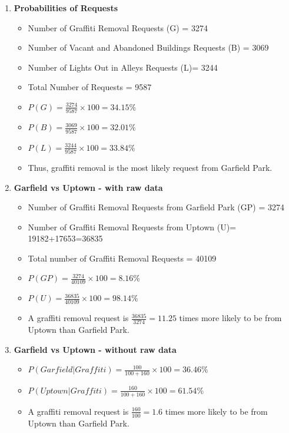 \documentclass[letterpaper,12pt]{article}
\begin{document}
\begin{enumerate}[label = \Alph*]
\item \textbf{Probabilities of Requests}
\begin{itemize}
\item Number of Graffiti Removal Requests (G) = 3274
\item Number of Vacant and Abandoned Buildings Requests (B) = 3069
\item Number of Lights Out in Alleys Requests (L)= 3244
\item Total Number of Requests = 9587
\item $P(G) = \frac{3274}{9587} \times 100 = 34.15\%$
\item $P(B) = \frac{3069}{9587} \times 100 = 32.01\%$
\item $P(L) = \frac{3244}{9587} \times 100 = 33.84\%$
\item Thus, graffiti removal is the most likely request from Garfield Park.
\end{itemize}

\item \textbf{Garfield vs Uptown - with raw data}
\begin{itemize}
\item Number of Graffiti Removal Requests from Garfield Park (GP) = 3274
\item Number of Graffiti Removal Requests from Uptown (U)= 19182+17653=36835
\item Total number of Graffiti Removal Requests = 40109
\item $P(GP) = \frac{3274}{40109} \times 100 = 8.16 \%$
\item $P(U) = \frac{36835}{40109} \times 100 = 98.14 \%$
\item A graffiti removal request is $\frac{36835}{3274} = 11.25$ times more likely to be from Uptown than Garfield Park.
\end{itemize}

\item \textbf{Garfield vs Uptown - without raw data}
\begin{itemize}
\item $P(Garfield | Graffiti) = \frac{100}{100+160} \times 100 = 36.46 \%$
\item $P(Uptown | Graffiti) = \frac{160}{100+160} \times 100 =61.54 \%$
\item A graffiti removal request is $\frac{160}{100} = 1.6$ times more likely to be from Uptown than Garfield Park.
\end{itemize}

\end{enumerate}
\end{document}
